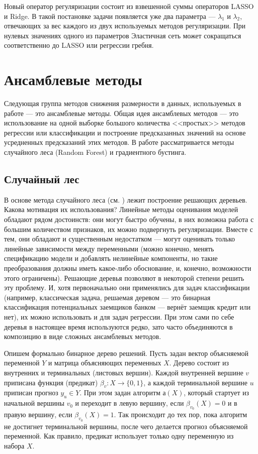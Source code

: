Новый оператор регуляризации состоит из взвешенной суммы операторов LASSO и Ridge. В такой постановке задачи появляется уже два параметра --- $\lambda_1$ и $\lambda_2$, отвечающих за вес каждого из двух используемых методов регуляризации. При нулевых значениях одного из параметров Эластичная сеть может сокращаться соответственно до LASSO или регрессии гребня.

\section{Ансамблевые методы}
Следующая группа методов снижения размерности в данных, используемых в работе --- это ансамблевые методы. Общая идея ансамблевых методов --- это использование на одной выборке большого количества <<простых>> методов регрессии или классификации и построение предсказанных значений на основе усредненных предсказаний этих методов. В работе рассматривается методы случайного леса (Random Forest) и градиентного бустинга.
\subsection{Случайный лес}
В основе метода случайного леса (см. \cite{liaw2002classification}) лежит построение решающих деревьев. Какова мотивация их использования? Линейные методы оценивания моделей обладают рядом достоинств: они могут быстро обучены, в них возможна работа с большим количеством признаков, их можно подвергнуть регуляризации. Вместе с тем, они обладают и существенным недостатком --- могут оценивать только линейные зависимости между переменными (можно конечно, менять спецификацию модели и добавлять нелинейные компоненты, но такие преобразования должны иметь какое-либо обоснование, и, конечно, возможности этого ограничены). Решающие деревья позволяют в некоторой степени решить эту проблему. И, хотя первоначально они применялись для задач классификации (например, классическая задача, решаемая деревом --- это бинарная классификация потенциальных заемщиков банком --- вернёт заемщик кредит или нет), их можно использовать и для задач регрессии. При этом сами по себе деревья в настоящее время используются редко, зато часто объединяются в композицию в виде сложных ансамблевых методов.

Опишем формально бинарное дерево решений. Пусть задан вектор объясняемой переменной $Y$ и матрица объясняющих переменных $X$.
Дерево состоит из внутренних и терминальных (листовых вершин). Каждой внутренней вершине $v$ приписана функция (предикат) $\beta_v: X \rightarrow \{0,1\}$, а каждой терминальной вершине $u$ приписан прогноз $y_u \in Y$. При этом задан алгоритм $а(X)$, который стартует из начальной вершины $v_0$ и переходит в левую вершину, если $\beta_{v_0}(X) = 0$ и в правую вершину, если $\beta_{v_0}(X) = 1$. Так происходит до тех пор, пока алгоритм не достигнет терминальной вершины, после чего делается прогноз объясняемой переменной.
Как правило, предикат использует только одну переменную из набора $X$. 

